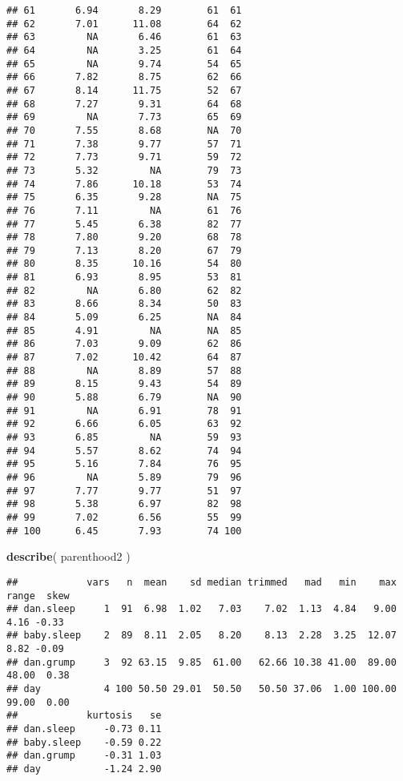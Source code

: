 \documentclass[
]{article}
\newenvironment{Shaded}{\begin{snugshade}}{\end{snugshade}}
\newcommand{\FunctionTok}[1]{\textcolor[rgb]{0.13,0.29,0.53}{\textbf{#1}}}
\newcommand{\NormalTok}[1]{#1}
\begin{document}
\begin{verbatim}
## 61       6.94       8.29        61  61
## 62       7.01      11.08        64  62
## 63         NA       6.46        61  63
## 64         NA       3.25        61  64
## 65         NA       9.74        54  65
## 66       7.82       8.75        62  66
## 67       8.14      11.75        52  67
## 68       7.27       9.31        64  68
## 69         NA       7.73        65  69
## 70       7.55       8.68        NA  70
## 71       7.38       9.77        57  71
## 72       7.73       9.71        59  72
## 73       5.32         NA        79  73
## 74       7.86      10.18        53  74
## 75       6.35       9.28        NA  75
## 76       7.11         NA        61  76
## 77       5.45       6.38        82  77
## 78       7.80       9.20        68  78
## 79       7.13       8.20        67  79
## 80       8.35      10.16        54  80
## 81       6.93       8.95        53  81
## 82         NA       6.80        62  82
## 83       8.66       8.34        50  83
## 84       5.09       6.25        NA  84
## 85       4.91         NA        NA  85
## 86       7.03       9.09        62  86
## 87       7.02      10.42        64  87
## 88         NA       8.89        57  88
## 89       8.15       9.43        54  89
## 90       5.88       6.79        NA  90
## 91         NA       6.91        78  91
## 92       6.66       6.05        63  92
## 93       6.85         NA        59  93
## 94       5.57       8.62        74  94
## 95       5.16       7.84        76  95
## 96         NA       5.89        79  96
## 97       7.77       9.77        51  97
## 98       5.38       6.97        82  98
## 99       7.02       6.56        55  99
## 100      6.45       7.93        74 100
\end{verbatim}

\begin{Shaded}
\begin{Highlighting}[]
\FunctionTok{describe}\NormalTok{( parenthood2 ) }
\end{Highlighting}
\end{Shaded}

\begin{verbatim}
##            vars   n  mean    sd median trimmed   mad   min    max range  skew
## dan.sleep     1  91  6.98  1.02   7.03    7.02  1.13  4.84   9.00  4.16 -0.33
## baby.sleep    2  89  8.11  2.05   8.20    8.13  2.28  3.25  12.07  8.82 -0.09
## dan.grump     3  92 63.15  9.85  61.00   62.66 10.38 41.00  89.00 48.00  0.38
## day           4 100 50.50 29.01  50.50   50.50 37.06  1.00 100.00 99.00  0.00
##            kurtosis   se
## dan.sleep     -0.73 0.11
## baby.sleep    -0.59 0.22
## dan.grump     -0.31 1.03
## day           -1.24 2.90
\end{verbatim}
\end{document}
